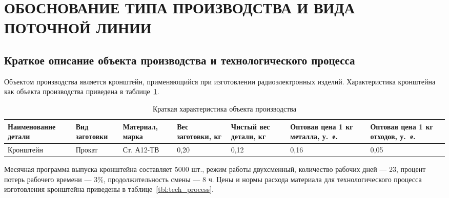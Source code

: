 \section[Обоснование типа производства и вида поточной линии]{%
  ОБОСНОВАНИЕ ТИПА ПРОИЗВОДСТВА И ВИДА \\
  ПОТОЧНОЙ ЛИНИИ
}
\label{sec:choice}

\subsection[%
Краткое описание объекта производства и технологического \\
процесса]{%
Краткое описание объекта производства и 
  технологического процесса
}

Объектом производства является кронштейн,
применяющийся при изготовлении радиоэлектронных изделий.
Характеристика кронштейна как объекта производства приведена
в таблице~\ref{tbl:piece_description}.

\begin{table} [h!]
  \caption{
    Краткая характеристика объекта производства
  }\label{tbl:piece_description}
  {\small
    \begin{tabular}{| m{2.7cm} | m{1.7cm} | m{2.1cm} | m{1.9cm} | m{1.4cm} | m{1.8cm} | m{1.8cm} |}
      \hline
      Наименование детали & Вид заготовки & Материал, марка
      & Вес заготовки, кг & Чистый вес детали, кг
      & Оптовая цена 1 кг металла, у.~е. & Оптовая цена 1 кг отходов, у.~е. \\
      \hline
      Кронштейн & Прокат & Ст. А12-ТВ
      & 0{,}20 & 0{,}12 
      & 0{,}16 & 0{,}05 \\
      \hline
    \end{tabular}
  }
\end{table}

Месячная программа выпуска кронштейна составляет 5000 шт.,
режим работы двухсменный, количество рабочих дней --- 23,
процент потерь рабочего времени --- 3\%, продолжительность смены --- 8 ч.
Цены и нормы расхода материала для технологического 
процесса изготовления кронштейна приведены в таблице~\ref{tbl:tech_process}.

